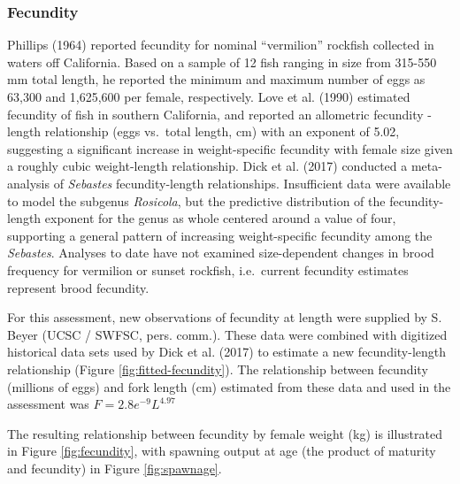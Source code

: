 \documentclass[11pt,
  english,
]{article}
\begin{document}

\hypertarget{fecundity}{%
\subsubsection{Fecundity}\label{fecundity}}

\leavevmode\tagmcend\tagstructend

Phillips {(1964)\leavevmode\tagmcend\tagstructend} reported fecundity for nominal ``vermilion'' rockfish collected in waters off California. Based on a sample of 12 fish ranging in size from 315-550 mm total length, he reported the minimum and maximum number of eggs as 63,300 and 1,625,600 per female, respectively. Love et al. {(1990)\leavevmode\tagmcend\tagstructend} estimated fecundity of fish in southern California, and reported an allometric fecundity - length relationship (eggs vs.~total length, cm) with an exponent of 5.02, suggesting a significant increase in weight-specific fecundity with female size given a roughly cubic weight-length relationship. Dick et al. {(2017)\leavevmode\tagmcend\tagstructend} conducted a meta-analysis of \emph{Sebastes} fecundity-length relationships. Insufficient data were available to model the subgenus \emph{Rosicola}, but the predictive distribution of the fecundity-length exponent for the genus as whole centered around a value of four, supporting a general pattern of increasing weight-specific fecundity among the \emph{Sebastes}. Analyses to date have not examined size-dependent changes in brood frequency for vermilion or sunset rockfish, i.e.~current fecundity estimates represent brood fecundity.

For this assessment, new observations of fecundity at length were supplied by S. Beyer (UCSC / SWFSC, pers. comm.). These data were combined with digitized historical data sets used by Dick et al. {(2017)\leavevmode\tagmcend\tagstructend} to estimate a new fecundity-length relationship (Figure \ref{fig:fitted-fecundity}). The relationship between fecundity (millions of eggs) and fork length (cm) estimated from these data and used in the assessment was {\(F = 2.8e^{-9}L^{4.97}\)\leavevmode\tagmcend\tagstructend}

The resulting relationship between fecundity by female weight (kg) is illustrated in Figure \ref{fig:fecundity}, with spawning output at age (the product of maturity and fecundity) in Figure \ref{fig:spawnage}.
\end{document}
